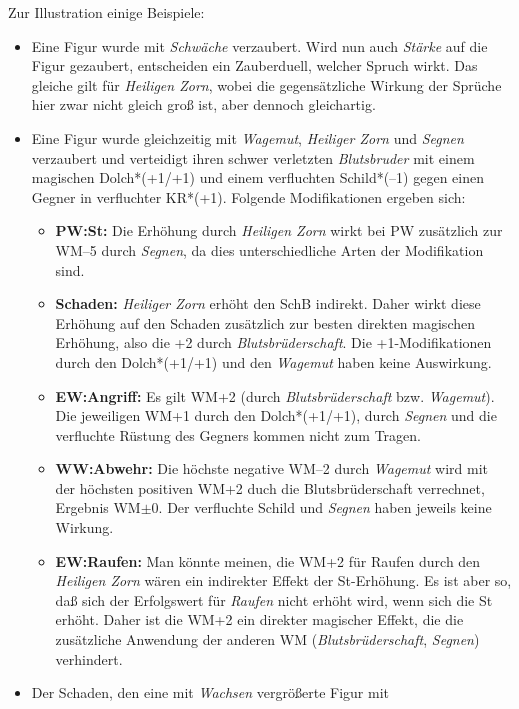 \documentclass[10pt,a4paper,germanpar]{article}
\begin{document}
Zur Illustration einige Beispiele:

\begin{itemize}
\item Eine Figur wurde mit \emph{Schwäche} verzaubert. Wird nun auch
  \emph{Stärke} auf die Figur gezaubert, entscheiden ein Zauberduell,
  welcher Spruch wirkt. Das gleiche gilt für \emph{Heiligen Zorn},
  wobei die gegensätzliche Wirkung der Sprüche hier zwar nicht gleich
  groß ist, aber dennoch gleichartig.
\item Eine Figur wurde gleichzeitig mit \emph{Wagemut}, \emph{Heiliger
    Zorn} und \emph{Segnen} verzaubert und verteidigt
  ihren schwer verletzten \emph{Blutsbruder} mit einem magischen
  Dolch*(+1/+1) und einem verfluchten Schild*(--1) gegen einen Gegner
  in verfluchter KR*(+1). Folgende Modifikationen ergeben sich:
  \begin{itemize}
  \item \textbf{PW:St:} Die Erhöhung durch \emph{Heiligen Zorn} wirkt bei
    PW zusätzlich zur WM--5 durch \emph{Segnen}, da dies
    unterschiedliche Arten der Modifikation sind.
  \item \textbf{Schaden:} \emph{Heiliger Zorn} erhöht den SchB
    indirekt. Daher wirkt diese Erhöhung auf den Schaden zusätzlich
    zur besten direkten magischen Erhöhung, also die +2 durch
    \emph{Blutsbrüderschaft}. Die +1-Modifikationen durch den
    Dolch*(+1/+1) und den \emph{Wagemut} haben keine Auswirkung.
  \item \textbf{EW:Angriff:} Es gilt WM+2 (durch
    \emph{Blutsbrüderschaft} bzw. \emph{Wagemut}). Die jeweiligen WM+1
    durch den Dolch*(+1/+1), durch \emph{Segnen} und die verfluchte
    Rüstung des Gegners kommen nicht zum Tragen.
  \item \textbf{WW:Abwehr:} Die höchste negative WM--2 durch
    \emph{Wagemut} wird mit der höchsten positiven WM+2 duch die
    Blutsbrüderschaft verrechnet, Ergebnis WM$\pm$0. Der verfluchte
    Schild und \emph{Segnen} haben jeweils keine Wirkung.
  \item \textbf{EW:Raufen:} Man könnte meinen, die WM+2 für Raufen
    durch den \emph{Heiligen Zorn} wären ein indirekter Effekt der
    St-Erhöhung. Es ist aber so, daß sich der Erfolgswert für
    \emph{Raufen} nicht erhöht wird, wenn sich die St erhöht. Daher
    ist die WM+2 ein direkter magischer Effekt, die die zusätzliche
    Anwendung der anderen WM (\emph{Blutsbrüderschaft}, \emph{Segnen})
    verhindert. 
  \end{itemize}
\item Der Schaden, den eine mit \emph{Wachsen} vergrößerte Figur mit

\end{itemize}
\end{document}
